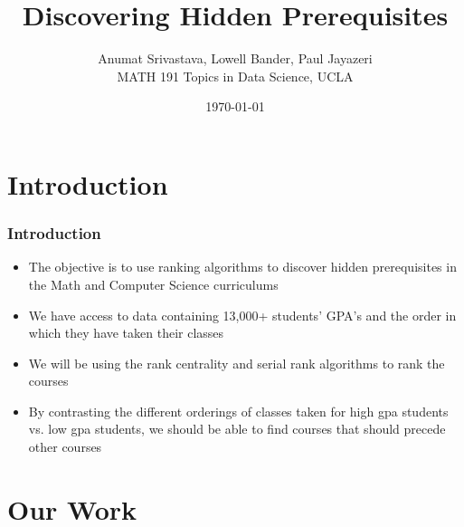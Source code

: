 \documentclass{beamer}
\title{Discovering Hidden Prerequisites}
\author{ Anumat Srivastava, Lowell Bander, Paul Jayazeri\\
\vspace{5mm}
MATH 191 Topics in Data Science, UCLA}
\date{ \today}
\begin{document}
\newtheorem{theo}{Theorem}
\newtheorem{lem}{Lemma}
\newtheorem{defin}{Definition}
\newtheorem{prop}{Proposition}
\newtheorem{ex}{Example}
\newtheorem{alg}{Algorithm}
\newtheorem{cor}{Corollary}
\newtheorem{case}{Case}


\begin{frame}
  \titlepage
\end{frame}



\section{Introduction}

\begin{frame}
     \frametitle{Introduction}
\begin{itemize}
\item The objective is to use ranking algorithms to discover hidden prerequisites in the Math and Computer Science curriculums 
\item  We have access to data containing 13,000+ students' GPA's and the order in which they have taken their classes
\item  We will be using the rank centrality and serial rank algorithms to rank the courses
\item By contrasting the different orderings of classes taken for high gpa students vs. low gpa students, we should be able to find courses that should precede other courses
\end{itemize}
\end{frame}



\section{Our Work}
\end{document}
